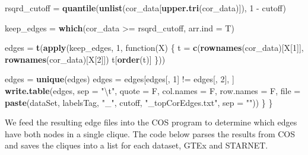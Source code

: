 \documentclass[]{article}
\newenvironment{Shaded}{\begin{snugshade}}{\end{snugshade}}
\newcommand{\KeywordTok}[1]{\textcolor[rgb]{0.13,0.29,0.53}{\textbf{{#1}}}}
\newcommand{\DataTypeTok}[1]{\textcolor[rgb]{0.13,0.29,0.53}{{#1}}}
\newcommand{\DecValTok}[1]{\textcolor[rgb]{0.00,0.00,0.81}{{#1}}}
\newcommand{\CharTok}[1]{\textcolor[rgb]{0.31,0.60,0.02}{{#1}}}
\newcommand{\StringTok}[1]{\textcolor[rgb]{0.31,0.60,0.02}{{#1}}}
\newcommand{\NormalTok}[1]{{#1}}
\begin{document}
\begin{Shaded}
\begin{Highlighting}[]
        \NormalTok{rsqrd_cutoff =}\StringTok{ }\KeywordTok{quantile}\NormalTok{(}\KeywordTok{unlist}\NormalTok{(cor_data[}\KeywordTok{upper.tri}\NormalTok{(cor_data)]), }
            \DecValTok{1} \NormalTok{-}\StringTok{ }\NormalTok{cutoff)}
        
        \NormalTok{keep_edges =}\StringTok{ }\KeywordTok{which}\NormalTok{(cor_data >=}\StringTok{ }\NormalTok{rsqrd_cutoff, }\DataTypeTok{arr.ind =} \NormalTok{T)}
        
        \NormalTok{edges =}\StringTok{ }\KeywordTok{t}\NormalTok{(}\KeywordTok{apply}\NormalTok{(keep_edges, }\DecValTok{1}\NormalTok{, function(X) \{}
            \NormalTok{t =}\StringTok{ }\KeywordTok{c}\NormalTok{(}\KeywordTok{rownames}\NormalTok{(cor_data)[X[}\DecValTok{1}\NormalTok{]], }\KeywordTok{rownames}\NormalTok{(cor_data)[X[}\DecValTok{2}\NormalTok{]])}
            \NormalTok{t[}\KeywordTok{order}\NormalTok{(t)]}
        \NormalTok{\}))}
        
        \NormalTok{edges =}\StringTok{ }\KeywordTok{unique}\NormalTok{(edges)}
        \NormalTok{edges =}\StringTok{ }\NormalTok{edges[edges[, }\DecValTok{1}\NormalTok{] !=}\StringTok{ }\NormalTok{edges[, }\DecValTok{2}\NormalTok{], ]}
        \KeywordTok{write.table}\NormalTok{(edges, }\DataTypeTok{sep =} \StringTok{"}\CharTok{\textbackslash{}t}\StringTok{"}\NormalTok{, }\DataTypeTok{quote =} \NormalTok{F, }\DataTypeTok{col.names =} \NormalTok{F, }
            \DataTypeTok{row.names =} \NormalTok{F, }\DataTypeTok{file =} \KeywordTok{paste}\NormalTok{(dataSet, labelsTag, }\StringTok{"_"}\NormalTok{, }
                \NormalTok{cutoff, }\StringTok{"_topCorEdges.txt"}\NormalTok{, }\DataTypeTok{sep =} \StringTok{""}\NormalTok{))}
    \NormalTok{\}}
\NormalTok{\}}
\end{Highlighting}
\end{Shaded}

We feed the resulting edge files into the COS program to determine which
edges have both nodes in a single clique. The code below parses the
results from COS and saves the cliques into a list for each dataset,
GTEx and STARNET.
\end{document}
